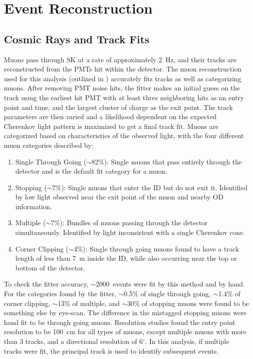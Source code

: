 \section{Event Reconstruction}
\label{sec:eventreco}

\subsection{Cosmic Rays and Track Fits}
\label{sec:muons}
Muons pass through SK at a rate of approximately 2~Hz, and their tracks are reconstructed from the PMTs hit within the detector. The muon reconstruction used for this analysis (outlined in \cite{muboy1, muboy2}) accurately fits tracks as well as categorizing muons. After removing PMT noise hits, the fitter makes an initial guess on the track using the earliest hit PMT with at least three neighboring hits as an entry point and time, and the largest cluster of charge as the exit point. The track parameters are then varied and a likelihood dependent on the expected Cherenkov light pattern is maximized to get a final track fit. Muons are categorized based on characteristics of the observed light, with the four different muon categories described by:
\begin{enumerate}
    \item Single Through Going ($\sim$82\%): Single muons that pass entirely through the detector and is the default fit category for a muon. 
    \item Stopping ($\sim$7\%): Single muons that enter the ID but do not exit it. Identified by low light observed near the exit point of the muon and nearby OD information. 
    \item Multiple ($\sim$7\%): Bundles of muons passing through the detector simultaneously. Identified by light inconsistent with a single Cherenkov cone. 
    \item Corner Clipping ($\sim$4\%): Single through going muons found to have a track length of less than 7~m inside the ID, while also occurring near the top or bottom of the detector. 
\end{enumerate}
To check the fitter accuracy, $\sim$2000~events were fit by this method and by hand. For the categories found by the fitter, $\sim$0.5\% of single through going, $\sim$1.4\% of corner clipping, $\sim$13\% of multiple, and $\sim$30\% of stopping muons were found to be something else by eye-scan. The difference in the mistagged stopping muons were hand fit to be through going muons. Resolution studies found the entry point resolution to be 100~cm for all types of muons, except multiple muons with more than 3 tracks, and a directional resolution of 6$^\circ$. In this analysis, if multiple tracks were fit, the principal track is used to identify subsequent events. 